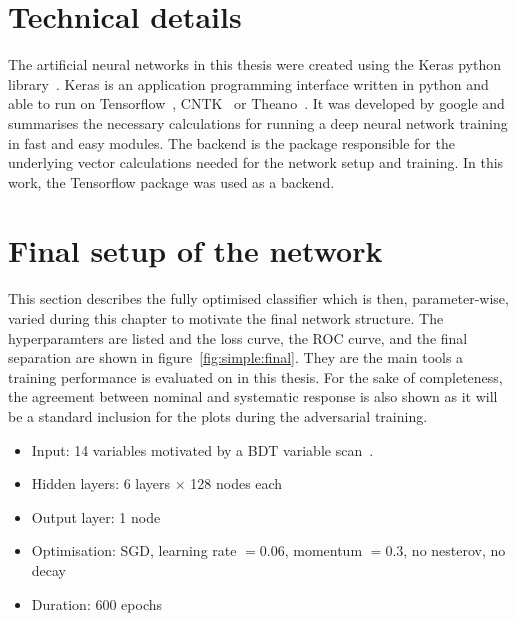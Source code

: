 \section{Technical details}
\label{sec:technicals}

The artificial neural networks in this thesis were created using the Keras python library~\cite{chollet2015keras}.
Keras is an application programming interface written in python and able to run on Tensorflow~\cite{tensorflow2015-whitepaper}, CNTK~\cite{cntk} or Theano~\cite{theano}. It was developed by google and summarises the necessary calculations for running a deep neural network training in fast and easy modules.
The backend is the package responsible for the underlying vector calculations needed for the network setup and training. In this work, the Tensorflow package was used as a backend.

\section{Final setup of the network}
\label{sec:simplesetup}

This section describes the fully optimised classifier which is then, parameter-wise, varied during this chapter to motivate the final network structure.
The hyperparamters are listed and the loss curve, the ROC curve, and the final separation are shown in figure~\ref{fig:simple:final}. They are the main tools a training performance is evaluated on in this thesis. For the sake of completeness, the agreement between nominal and systematic response is also shown as it will be a standard inclusion for the plots during the adversarial training.


\begin{itemize}
\item Input: \num{14} variables motivated by a BDT variable scan~\cite{Finelli:2667560}.
\item Hidden layers: \num{6} \ELU layers $\times$ \num{128} nodes each
\item Output layer: \num{1} \SIGMOID node
\item Optimisation: SGD, learning rate $=0.06$, momentum $=0.3$, no nesterov, no decay
\item Duration: 600 epochs
\end{itemize}

